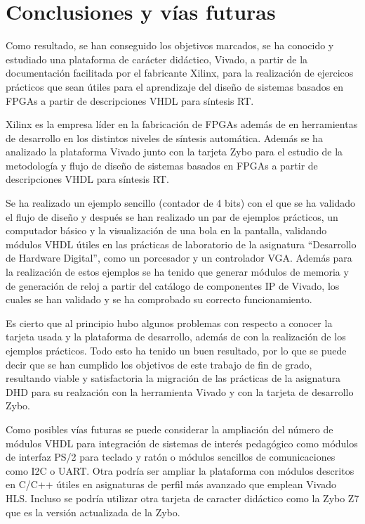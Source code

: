 \chapter{Conclusiones y vías futuras}

Como resultado, se han conseguido los objetivos marcados, se ha conocido y estudiado una plataforma de carácter didáctico, Vivado, a partir de la documentación facilitada 
por el fabricante Xilinx, para la realización de ejercicos prácticos que sean útiles para el aprendizaje del diseño de sistemas basados en FPGAs a partir de descripciones VHDL para síntesis RT. 

Xilinx es la empresa líder en la fabricación de FPGAs además de en herramientas de desarrollo en los distintos niveles de síntesis automática. Además se 
ha analizado la plataforma Vivado junto con la tarjeta Zybo para el estudio de la metodología y flujo de diseño de sistemas basados en FPGAs a partir de descripciones VHDL para síntesis RT.

Se ha realizado un ejemplo sencillo (contador de 4 bits) con el que se ha validado el flujo de diseño y después se han realizado un par de ejemplos prácticos, un computador 
básico y la visualización de una bola en la pantalla, validando módulos VHDL útiles en las prácticas de laboratorio de la asignatura ``Desarrollo de Hardware Digital'', como un porcesador y 
un controlador VGA. Además para la realización de estos ejemplos se ha tenido que generar módulos de memoria y de generación de reloj a partir del catálogo de componentes 
IP de Vivado, los cuales se han validado y se ha comprobado su correcto funcionamiento.

Es cierto que al principio hubo algunos problemas con respecto a conocer la tarjeta usada y la plataforma de desarrollo, además de con la realización 
de los ejemplos prácticos. Todo esto ha tenido un buen resultado, por lo que se puede decir que se han cumplido los objetivos de este trabajo de fin de grado, resultando viable 
y satisfactoria la migración de las prácticas de la asignatura DHD para su realzación con la herramienta Vivado y con la tarjeta de desarrollo Zybo.

Como posibles vías futuras se puede considerar la ampliación del número de módulos VHDL para integración de sistemas de interés pedagógico como módulos de interfaz PS/2 para teclado y 
ratón o módulos sencillos de comunicaciones como I2C o UART. Otra podría ser ampliar la plataforma con módulos descritos en C/C++ útiles en asignaturas de perfil más 
avanzado que emplean Vivado HLS. Incluso se podría utilizar otra tarjeta de caracter didáctico como la Zybo Z7 que es la versión actualizada de la Zybo.

